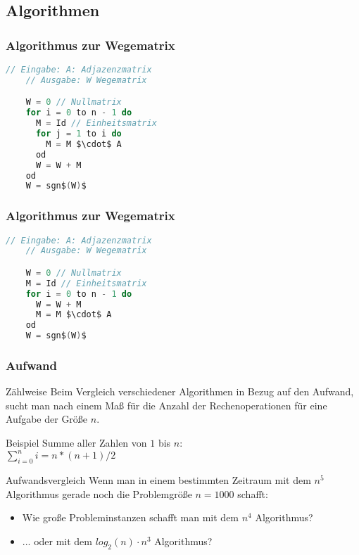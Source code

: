 \subsection{Algorithmen}

\begin{frame}[fragile]
	\frametitle{Algorithmus zur Wegematrix}
  \begin{lstlisting}[language = Java,mathescape,morekeywords={set}]
    // Eingabe: A: Adjazenzmatrix
    // Ausgabe: W Wegematrix

    W = 0 // Nullmatrix
    for i = 0 to n - 1 do
      M = Id // Einheitsmatrix
      for j = 1 to i do
        M = M $\cdot$ A
      od
      W = W + M
    od
    W = sgn$(W)$
  \end{lstlisting}
\end{frame}

\begin{frame}[fragile]
	\frametitle{Algorithmus zur Wegematrix}
  \begin{lstlisting}[language = Java,mathescape,morekeywords={set}]
    // Eingabe: A: Adjazenzmatrix
    // Ausgabe: W Wegematrix

    W = 0 // Nullmatrix
    M = Id // Einheitsmatrix
    for i = 0 to n - 1 do
      W = W + M
      M = M $\cdot$ A
    od
    W = sgn$(W)$
  \end{lstlisting}
\end{frame}

\begin{frame}
	\frametitle{Aufwand}
	\begin{block}{Zählweise}
		Beim Vergleich verschiedener Algorithmen in Bezug auf den Aufwand, sucht man nach einem Maß für die Anzahl der Rechenoperationen für eine Aufgabe der Größe $n$.
	\end{block}
	\begin{block}{Beispiel} \pause
		Summe aller Zahlen von $1$ bis $n$: \\
			$\sum^n_{i=0} i = $\pause$n*(n+1)/2$
	\end{block}
\end{frame}

\begin{frame}
	\begin{block}{Aufwandsvergleich}
		Wenn man in einem bestimmten Zeitraum mit dem $n^5$ Algorithmus gerade noch die Problemgröße $n=1000$ schafft:
	  \begin{itemize}
		  \item Wie große Probleminstanzen schafft man mit dem $n^4$ Algorithmus? \pause
		  \item ... oder mit dem $log_2(n) \cdot n^3$ Algorithmus?
	  \end{itemize}
	\end{block}
\end{frame}

